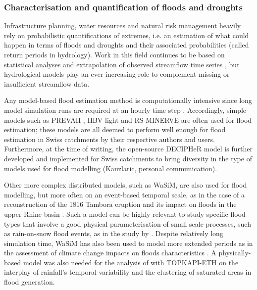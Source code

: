 \documentclass[10pt,a4paper]{article}
\begin{document}
\subsubsection{Characterisation and quantification of floods and droughts}
\label{sec:context:floodsdroughts}

Infrastructure planning, water resources and natural risk management heavily rely on probabilistic quantifications of extremes, i.e. an estimation of what could happen in terms of floods and droughts and their associated probabilities (called return periods in hydrology). Work in this field continues to be based on statistical analyses and extrapolation of observed streamflow time series \citep{Brunner2018, Asadi20108}, but hydrological models play an ever-increasing role to complement missing or insufficient streamflow data.

Any model-based flood estimation method is computationally intensive since long model simulation runs are required at an hourly time step \citep[see][about reducing computational requirements for extreme flood estimation by hydrological modelling]{SikorskaSenoner2020}. Accordingly, simple models such as PREVAH \citep{Viviroli2009, Viviroli2009c, Felder2017}, HBV-light \citep{Sikorska2017, Brunner2019a, SikorskaSenoner2020} and  RS MINERVE \citep{Bieri2013, Zeimetz2017, Zeimetz2018} are often used for flood estimation; these models are all deemed to perform well enough for flood estimation in Swiss catchments by their respective authors and users. Furthermore, at the time of writing, the open-source DECIPHeR model is further developed and implemented for Swiss catchments to bring diversity in the type of models used for flood modelling (Kauzlaric, personal communication).

Other more complex distributed models, such as WaSiM, are also used for flood modelling, but more often on an event-based temporal scale, as in the case of a reconstruction of the 1816 Tambora eruption and its impact on floods in the upper Rhine basin \citep[see Fig. \ref{fig:map};][]{Rossler2018}. Such a model can be highly relevant to study specific flood types that involve a good physical parameterisation of small scale processes, such as rain-on-snow flood events, as in the study by \citet{Rossler2014}. Despite relatively long simulation time, WaSiM has also been used to model more extended periods as in the assessment of climate change impacts on floods characteristics \citep{Keller2019a}. A physically-based model was also needed for the analysis of \citet{Paschalis2014} with TOPKAPI-ETH on the interplay of rainfall's temporal variability and the clustering of saturated areas in flood generation.
\end{document}
